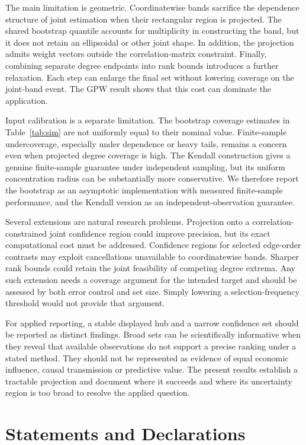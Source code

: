 \documentclass[pdflatex,sn-mathphys-ay]{sn-jnl}
\theoremstyle{thmstyleone}
\theoremstyle{thmstyletwo}
\begin{document}
The main limitation is geometric. Coordinatewise bands sacrifice the dependence structure of joint estimation when their rectangular region is projected. The shared bootstrap quantile accounts for multiplicity in constructing the band, but it does not retain an ellipsoidal or other joint shape. In addition, the projection admits weight vectors outside the correlation-matrix constraint. Finally, combining separate degree endpoints into rank bounds introduces a further relaxation. Each step can enlarge the final set without lowering coverage on the joint-band event. The GPW result shows that this cost can dominate the application.

Input calibration is a separate limitation. The bootstrap coverage estimates in Table~\ref{tab:sim} are not uniformly equal to their nominal value. Finite-sample undercoverage, especially under dependence or heavy tails, remains a concern even when projected degree coverage is high. The Kendall construction gives a genuine finite-sample guarantee under independent sampling, but its uniform concentration radius can be substantially more conservative. We therefore report the bootstrap as an asymptotic implementation with measured finite-sample performance, and the Kendall version as an independent-observation guarantee.

Several extensions are natural research problems. Projection onto a correlation-constrained joint confidence region could improve precision, but its exact computational cost must be addressed. Confidence regions for selected edge-order contrasts may exploit cancellations unavailable to coordinatewise bands. Sharper rank bounds could retain the joint feasibility of competing degree extrema. Any such extension needs a coverage argument for the intended target and should be assessed by both error control and set size. Simply lowering a selection-frequency threshold would not provide that argument.

For applied reporting, a stable displayed hub and a narrow confidence set should be reported as distinct findings. Broad sets can be scientifically informative when they reveal that available observations do not support a precise ranking under a stated method. They should not be represented as evidence of equal economic influence, causal transmission or predictive value. The present results establish a tractable projection and document where it succeeds and where its uncertainty region is too broad to resolve the applied question.

\section*{Statements and Declarations}
\end{document}
